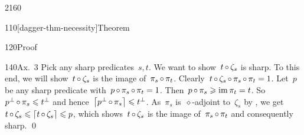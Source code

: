 \begin{parsec}{2160}
\begin{point}{110}[dagger-thm-necessity]{Theorem}
\begin{point}{120}{Proof}
\begin{point}{140}{Ax.~3}
Pick any sharp predicates~$s,t$.
We want to show~$t \mathop{\circ} \zeta_s$ is sharp.
To this end, we will show~$t \mathop{\circ} \zeta_s$
    is the image of~$\pi_s \mathop{\circ} \pi_t$.
Clearly~$t \mathop{\circ} \zeta_s \mathop{\circ} \pi_s \mathop{\circ} \pi_t = 1$.
Let~$p$ be any sharp predicate with~$p \mathop{\circ} \pi_s \mathop{\circ} \pi_t = 1$.
Then~$p \mathop{\circ} \pi_s \geqslant \operatorname{im} \pi_t = t$.
So~$  p^\perp \mathop{\circ} \pi_s \leqslant t^\perp$
and hence~$\left\lceil p^\perp \mathop{\circ} \pi_s\right\rceil \leqslant t^\perp$.
As~$\pi_s$ is~$\diamond$-adjoint to~$\zeta_s$ by ,
we get~$t \mathop{\circ} \zeta_s \leqslant \left\lceil t \mathop{\circ} \zeta_s\right\rceil \leqslant p$,
    which shows~$t \mathop{\circ} \zeta_s$
    is the image of~$\pi_s \mathop{\circ} \pi_t$
    and consequently sharp. \qed
\end{point}
\end{point}
\end{point}

    
\end{parsec}

